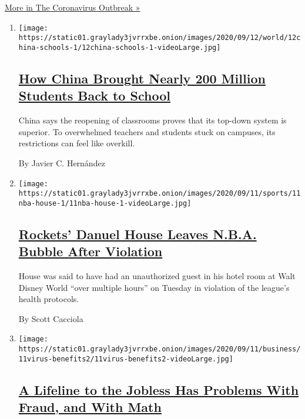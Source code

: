 \href{/news-event/coronavirus}{More in The Coronavirus Outbreak »}

\begin{enumerate}
\def\labelenumi{\arabic{enumi}.}
\item
  \texttt{[image: https://static01.graylady3jvrrxbe.onion/images/2020/09/12/world/12china-schools-1/12china-schools-1-videoLarge.jpg]}

  \hypertarget{how-china-brought-nearly-200-million-students-back-to-school}{%
  \subsection{\texorpdfstring{\href{/2020/09/12/world/asia/china-schools-reopening.html}{How
  China Brought Nearly 200 Million Students Back to
  School}}{How China Brought Nearly 200 Million Students Back to School}}\label{how-china-brought-nearly-200-million-students-back-to-school}}

  China says the reopening of classrooms proves that its top-down system
  is superior. To overwhelmed teachers and students stuck on campuses,
  its restrictions can feel like overkill.

  By Javier C. Hernández
\item
  \texttt{[image: https://static01.graylady3jvrrxbe.onion/images/2020/09/11/sports/11nba-house-1/11nba-house-1-videoLarge.jpg]}

  \hypertarget{rockets-danuel-house-leaves-nba-bubble-after-violation}{%
  \subsection{\texorpdfstring{\href{/2020/09/11/sports/basketball/nba-houston-rockets-danuel-house.html}{Rockets'
  Danuel House Leaves N.B.A. Bubble After
  Violation}}{Rockets' Danuel House Leaves N.B.A. Bubble After Violation}}\label{rockets-danuel-house-leaves-nba-bubble-after-violation}}

  House was said to have had an unauthorized guest in his hotel room at
  Walt Disney World ``over multiple hours'' on Tuesday in violation of
  the league's health protocols.

  By Scott Cacciola
\item
  \texttt{[image: https://static01.graylady3jvrrxbe.onion/images/2020/09/11/business/11virus-benefits2/11virus-benefits2-videoLarge.jpg]}

  \hypertarget{a-lifeline-to-the-jobless-has-problems-with-fraud-and-with-math}{%
  \subsection{\texorpdfstring{\href{/2020/09/11/business/economy/pandemic-unemployment-assistance-fraud.html}{A
  Lifeline to the Jobless Has Problems With Fraud, and With
  Math}}{A Lifeline to the Jobless Has Problems With Fraud, and With Math}}\label{a-lifeline-to-the-jobless-has-problems-with-fraud-and-with-math}}


\end{enumerate}
